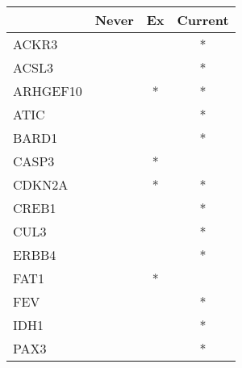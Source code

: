 \begin{tabular}{lccc}
\toprule
{} & Never & Ex & Current \\
\midrule
ACKR3    &       &    &       * \\
ACSL3    &       &    &       * \\
ARHGEF10 &       &  * &       * \\
ATIC     &       &    &       * \\
BARD1    &       &    &       * \\
CASP3    &       &  * &         \\
CDKN2A   &       &  * &       * \\
CREB1    &       &    &       * \\
CUL3     &       &    &       * \\
ERBB4    &       &    &       * \\
FAT1     &       &  * &         \\
FEV      &       &    &       * \\
IDH1     &       &    &       * \\
PAX3     &       &    &       * \\
\bottomrule
\end{tabular}
